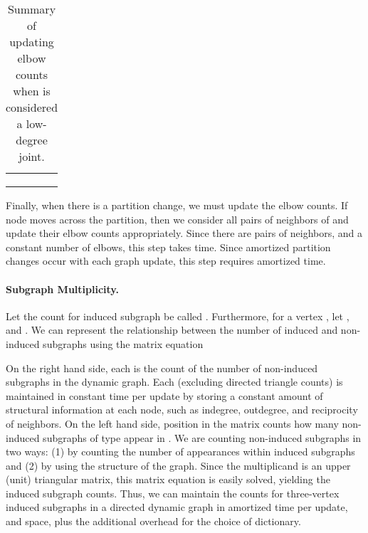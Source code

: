 \documentclass[11pt]{article}
\renewcommand{\subsection}[1]{\paragraph{\textbf{#1}.}}
\begin{document}
\begin{table}[!b]
\vspace*{-12pt}
\caption{Summary of updating elbow counts when  is considered a low-degree joint.}
\label{tab-elbowupdate}
\begin{center}
\begin{tabular}{l|c|c}
&  &  \\ \hline
 &
 & 

 \\ \hline

 &
 & 

 \\ \hline

 &
 & 

 \\
\end{tabular}
\end{center}
\end{table}


Finally, when there is a partition change, we must update the elbow counts.
If node  moves across the partition, then we consider all pairs of neighbors of 
 and update their elbow counts appropriately. Since there are  pairs
of neighbors, and a constant number of elbows, this step takes  time. Since
 amortized partition changes occur with each graph update, this step requires
 amortized time.



\subsection{Subgraph Multiplicity}

Let the count for induced subgraph  be called .  Furthermore, for
a vertex , let , 
 and .
We can represent the relationship between the number of induced and non-induced 
subgraphs using the matrix equation

\vspace*{-10pt}
{\small
\setcounter{MaxMatrixCols}{16}

}

On the right hand side, each  is the count of the number of
non-induced  subgraphs in the dynamic graph. Each  (excluding
directed triangle counts) is maintained in constant time per update by 
storing a constant amount of structural information at each node, 
such as indegree, outdegree, and reciprocity of neighbors. On the left 
hand side, position  in the matrix counts how many non-induced 
subgraphs of type  appear in . We are counting non-induced 
subgraphs in two ways: (1) by counting the number of appearances within 
induced subgraphs and (2) by using the structure of the graph. Since 
the multiplicand is an upper (unit) triangular matrix, this matrix 
equation is easily solved, yielding the induced subgraph counts. Thus,
we can maintain the counts for three-vertex induced subgraphs in a directed
dynamic graph in  amortized time per update, and  space, 
plus the additional overhead for the choice of dictionary.
\end{document}
